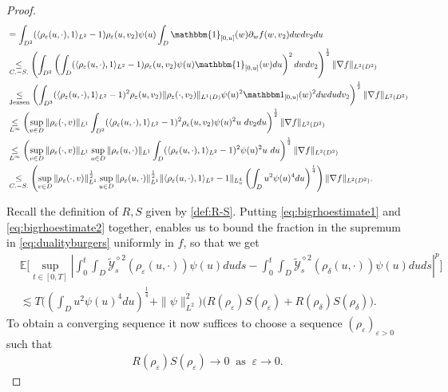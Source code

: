 \documentclass[a4paper, reqno, 12pt]{amsart}
\theoremstyle{plain}
\theoremstyle{definition}
\begin{document}
\begin{proof}
\begin{align}
        & = \int_{D^2}  (\langle\rho_{\varepsilon}(u,\cdot),1\rangle_{L^2} - 1) \rho_{\varepsilon}(u,v_2) \psi(u) \int_D \mathbbm{1}_{[0,u]}(w) \partial_w f(w,v_2)dw dv_2 du \nonumber\\
        & \underset{C.-S.}{\leq} \left(\int_{D^2}\left( \int_{D} (\langle\rho_{\varepsilon}(u,\cdot),1\rangle_{L^2} - 1) \rho_{\varepsilon}(u,v_2) \psi(u)  \mathbbm{1}_{[0,u]}(w)  du\right)^2dw dv_2 \right)^{\frac12} \|\nabla f\|_{L^2(D^2)}  \nonumber\\  
        & \underset{\text{Jensen}}{\leq} \left(\int_{D^3} (\langle \rho_{\varepsilon}(u,\cdot),1\rangle_{L^2} -1)^2 \rho_{\varepsilon}(u,v_2)\|\rho_{\varepsilon}(\cdot,v_2)\|_{L^1(D)}\psi(u)^2 \mathbbm 1_{[0,u]}(w)^2 dwdudv_2 \right)^{\frac12} \|\nabla f\|_{L^2(D^2)}  \nonumber\\
        & \underset{L^{\infty}}{\leq} \left(\sup_{v\in D} \|\rho_{\varepsilon}(\cdot,v)\|_{L^1}\int_{D^2} (\langle \rho_{\varepsilon}(u,\cdot),1\rangle_{L^2} -1)^2 \rho_{\varepsilon}(u,v_2) \psi(u)^2 u \ dv_2du \right)^{\frac12} \|\nabla f\|_{L^2(D^2)}  \nonumber\\      
        & \underset{L^{\infty}}{\leq} \left(\sup_{v\in D} \|\rho_{\varepsilon}(\cdot,v)\|_{L^1}\sup_{u\in D} \|\rho_{\varepsilon}(u,\cdot)\|_{L^1} \int_{D}(\langle \rho_{\varepsilon}(u,\cdot),1\rangle_{L^2} -1)^2 \psi(u)^2 u \ du \right)^{\frac12} \|\nabla f\|_{L^2(D^2)}  \nonumber\\
        & \underset{C.-S.}{\leq} \left(\sup_{v\in D} \|\rho_{\varepsilon}(\cdot,v)\|_{L^1}^{\frac12}\sup_{u\in D} \|\rho_{\varepsilon}(u,\cdot)\|_{L^1}^{\frac12}\|\langle \rho_{\varepsilon}(u,\cdot),1\rangle_{L^2} -1\|_{L_u^4} \left(\int_D u^2\psi(u)^4 du\right)^{\frac{1}{4}}\right) \|\nabla f\|_{L^2(D^2)} .
    \end{align}
    
    Recall the definition of $R,S$ given by \eqref{def:R-S}. Putting \eqref{eq:bigrhoestimate1} and \eqref{eq:bigrhoestimate2} together, enables us to bound the fraction in the supremum in \eqref{eq:dualityburgers} uniformly in $f$, so that we get
    \begin{equation}
    \label{eq:linftyl2normapprox}
    \begin{split}
        &\mathbb{E}\Bigg[\sup_{t\in[0,T]} \left| \int_0^t\int_{D}\tilde{\mathcal{Y}}^{\diamond 2}_s(\rho_{\varepsilon}(u,\cdot))\psi(u) du ds - \int_0^t\int_{D}\tilde{\mathcal{Y}}^{\diamond 2}_s(\rho_{\delta}(u,\cdot))\psi(u) du ds \right|^p \Bigg] \\
        & \lesssim T \Big(\left(\int_D u^2\psi(u)^4 du\right)^{\frac{1}{4}} + \|\psi\|_{L^2}^2\Big) \big( R(\rho_{\varepsilon}) S(\rho_{\varepsilon}) +R(\rho_{\delta}) S(\rho_{\delta})\big).
    \end{split}
    \end{equation}
 To obtain a converging sequence it now suffices to choose a sequence $(\rho_{\varepsilon})_{\varepsilon>0}$ such that 
    \begin{align} \label{eq:approxbound}
        R(\rho_{\varepsilon})S(\rho_{\varepsilon})\to 0 \ \text{ as }\ \varepsilon \to 0.
    \end{align}



\end{proof}
\end{document}
